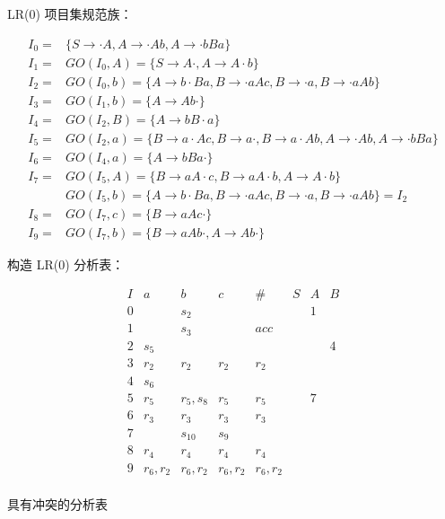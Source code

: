 \begin{enumerate}
    LR(0) 项目集规范族：
    
    \begin{equation*}
        \begin{array}{cl}
            I_0 = & \{S \to \cdot A, A \to \cdot Ab, A \to \cdot bBa\} \\
            \hline
            I_1 = & GO(I_0, A) = \{S \to A \cdot, A \to A \cdot b \} \\
            I_2 = & GO(I_0, b) = \{A \to b \cdot Ba, B \to \cdot aAc, B \to \cdot a, B \to \cdot aAb \}\\
            \hline
            I_3 = & GO(I_1, b) = \{A \to Ab \cdot\} \\
            \hline
            I_4 = & GO(I_2, B) = \{A \to bB \cdot a\} \\
            I_5 = & GO(I_2, a) = \{B \to a \cdot Ac, B \to a \cdot, B \to a \cdot Ab, A \to \cdot Ab, A \to \cdot bBa\} \\
            \hline
            I_6 = & GO(I_4, a) = \{A \to bBa \cdot \} \\
            \hline
            I_7 = & GO(I_5, A) = \{B \to aA \cdot c, B \to aA \cdot b, A \to A \cdot b \} \\
                  & GO(I_5, b) = \{A \to b \cdot Ba, B \to \cdot aAc, B \to \cdot a, B \to \cdot aAb \} = I_2 \\
            \hline
            I_8 = & GO(I_7, c) = \{B \to aAc \cdot\} \\
            I_9 = & GO(I_7, b) = \{B \to aAb \cdot, A \to Ab \cdot\}
        \end{array}
    \end{equation*}
    
    构造 LR(0) 分析表：
    
    \begin{table}[H]
        \centering
        \begin{equation*}
            \begin{array}{c|cccc|ccc}
                I & a & b & c & \# & S & A & B \\
                \hline
                0 & & s_2 & & & & 1 & \\
                1 & & s_3 & & acc & & & \\
                2 & s_5 & & & & & & 4 \\
                3 & r_2 & r_2 & r_2 & r_2 & & & \\
                4 & s_6 & & & & & & \\
                5 & r_5 & r_5, s_8 & r_5 & r_5 & & 7 & \\
                6 & r_3 & r_3 & r_3 & r_3 & & & \\
                7 & & s_{10} & s_9 & & & & \\
                8 & r_4 & r_4 & r_4 & r_4 & & & \\
                9 & r_6, r_2 & r_6, r_2 & r_6, r_2 & r_6, r_2 & & & \\
            \end{array}
        \end{equation*}
        \caption{具有冲突的分析表}
        \label{tab:SLR_7_1}
    \end{table}
    

\end{enumerate}
